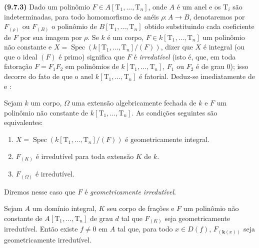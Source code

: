 \textbf{(9.7.3)}
\label{IV.9.7.3}
Dado um polinômio $F\in A[\mathrm{T}_1,\ldots,\mathrm{T}_n]$, onde $A$ é um anel e os $\mathrm{T}_i$ são indeterminadas, para todo homomorfismo de anéis $\rho:A\to B$, denotaremos por $F_{(\rho)}$ ou $F_{(B)}$ o polinômio de $B[\mathrm{T}_1,\ldots,\mathrm{T}_n]$ obtido substituindo cada coeficiente de $F$ por sua imagem por $\rho$.
Se $k$ é um corpo, $F\in k[\mathrm{T}_1,\ldots,\mathrm{T}_n]$ um polinômio não constante e $X=\operatorname{Spec}(k[\mathrm{T}_1,\ldots,\mathrm{T}_n]/(F))$, dizer que $X$ é integral (ou que o ideal $(F)$ é primo) significa que $F$ é \emph{irredutível} (isto é, que, em toda fatoração $F=F_1F_2$ em polinômios de $k[\mathrm{T}_1,\ldots,\mathrm{T}_n]$, $F_1$ ou $F_2$ é de grau $0$); isso decorre do fato de que o anel $k[\mathrm{T}_1,\ldots,\mathrm{T}_n]$ é fatorial.
Deduz-se imediatamente de  e :

\begin{lemma}[9.7.4]
\label{IV.9.7.4}
Sejam $k$ um corpo, $\Omega$ uma extensão algebricamente fechada de $k$ e $F$ um polinômio não constante de $k[\mathrm{T}_1,\ldots,\mathrm{T}_n]$.
As condições seguintes são equivalentes:
\begin{enumerate}[label=\emph{\alph*)}]
  \item $X=\operatorname{Spec}(k[\mathrm{T}_1,\ldots,\mathrm{T}_n]/(F))$ é geometricamente integral.
  \item $F_{(K)}$ é irredutível para toda extensão $K$ de $k$.
  \item $F_{(\Omega)}$ é irredutível.
\end{enumerate}
Diremos nesse caso que $F$ é \emph{geometricamente irredutível}.
\end{lemma}

\begin{lemma}[9.7.5]
\label{IV.9.7.5}
Sejam $A$ um domínio integral, $K$ seu corpo de frações e $F$ um polinômio não constante de $A[\mathrm{T}_1,\ldots,\mathrm{T}_n]$ de grau $d$ tal que $F_{(K)}$ seja geometricamente irredutível.
Então existe $f\neq 0$ em $A$ tal que, para todo $x\in D(f)$, $F_{(\boldsymbol{k}(x))}$ seja geometricamente irredutível.
\end{lemma}


